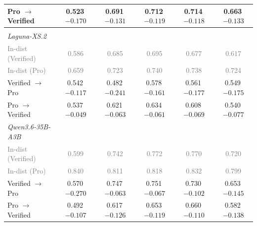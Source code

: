 \begin{table}[t]
\begin{tabular}{lccccc}
\qquad{}Pro $\rightarrow$ Verified & 0.523\,{\scriptsize \textcolor{red!70!black}{$-0.170$}} & 0.691\,{\scriptsize \textcolor{red!70!black}{$-0.131$}} & 0.712\,{\scriptsize \textcolor{red!70!black}{$-0.119$}} & 0.714\,{\scriptsize \textcolor{red!70!black}{$-0.118$}} & 0.663\,{\scriptsize \textcolor{red!70!black}{$-0.133$}}  \\
\midrule
\multicolumn{6}{l}{\textit{\Regressions{}}} \\
\quad{}\textit{Laguna-XS.2} \\
\qquad{}\textcolor{gray}{\small In-dist (Verified)} & \textcolor{gray}{\small 0.586} & \textcolor{gray}{\small 0.685} & \textcolor{gray}{\small 0.695} & \textcolor{gray}{\small 0.677} & \textcolor{gray}{\small 0.617} \\
\qquad{}\textcolor{gray}{\small In-dist (Pro)} & \textcolor{gray}{\small 0.659} & \textcolor{gray}{\small 0.723} & \textcolor{gray}{\small 0.740} & \textcolor{gray}{\small 0.738} & \textcolor{gray}{\small 0.724} \\
\qquad{}Verified $\rightarrow$ Pro & 0.542\,{\scriptsize \textcolor{red!70!black}{$-0.117$}} & 0.482\,{\scriptsize \textcolor{red!70!black}{$-0.241$}} & 0.578\,{\scriptsize \textcolor{red!70!black}{$-0.161$}} & 0.561\,{\scriptsize \textcolor{red!70!black}{$-0.177$}} & 0.549\,{\scriptsize \textcolor{red!70!black}{$-0.175$}}  \\
\qquad{}Pro $\rightarrow$ Verified & 0.537\,{\scriptsize \textcolor{red!70!black}{$-0.049$}} & 0.621\,{\scriptsize \textcolor{red!70!black}{$-0.063$}} & 0.634\,{\scriptsize \textcolor{red!70!black}{$-0.061$}} & 0.608\,{\scriptsize \textcolor{red!70!black}{$-0.069$}} & 0.540\,{\scriptsize \textcolor{red!70!black}{$-0.077$}}  \\
\quad{}\textit{Qwen3.6-35B-A3B} \\
\qquad{}\textcolor{gray}{\small In-dist (Verified)} & \textcolor{gray}{\small 0.599} & \textcolor{gray}{\small 0.742} & \textcolor{gray}{\small 0.772} & \textcolor{gray}{\small 0.770} & \textcolor{gray}{\small 0.720} \\
\qquad{}\textcolor{gray}{\small In-dist (Pro)} & \textcolor{gray}{\small 0.840} & \textcolor{gray}{\small 0.811} & \textcolor{gray}{\small 0.818} & \textcolor{gray}{\small 0.832} & \textcolor{gray}{\small 0.799} \\
\qquad{}Verified $\rightarrow$ Pro & 0.570\,{\scriptsize \textcolor{red!70!black}{$-0.270$}} & 0.747\,{\scriptsize \textcolor{red!70!black}{$-0.063$}} & 0.751\,{\scriptsize \textcolor{red!70!black}{$-0.067$}} & 0.730\,{\scriptsize \textcolor{red!70!black}{$-0.102$}} & 0.653\,{\scriptsize \textcolor{red!70!black}{$-0.145$}}  \\
\qquad{}Pro $\rightarrow$ Verified & 0.492\,{\scriptsize \textcolor{red!70!black}{$-0.107$}} & 0.617\,{\scriptsize \textcolor{red!70!black}{$-0.126$}} & 0.653\,{\scriptsize \textcolor{red!70!black}{$-0.119$}} & 0.660\,{\scriptsize \textcolor{red!70!black}{$-0.110$}} & 0.582\,{\scriptsize \textcolor{red!70!black}{$-0.138$}}  \\
\bottomrule
\end{tabular}
\end{table}